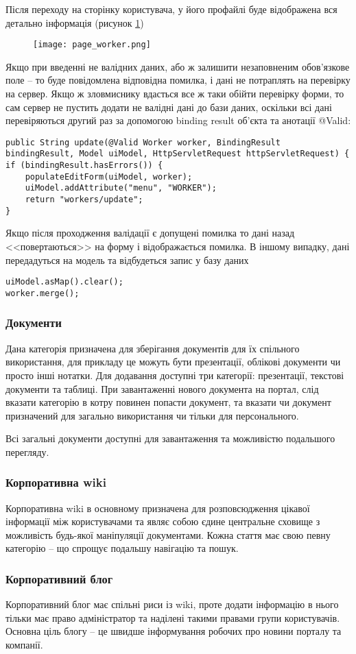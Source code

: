 \par Після переходу на сторінку користувача, у його профайлі буде відображена вся детально інформація (рисунок \ref{pic:page_worker})
  \begin{figure}[!ht]
  \centering
      \texttt{[image: page\_worker.png]}
      \label{pic:page_worker}
  \end{figure}
\par Якщо при введенні не валідних даних, або ж залишити незаповненим обов'язкове поле -- то буде повідомлена відповідна помилка, і дані не потраплять на перевірку на сервер. Якщо ж зловмиснику вдасться все ж таки обійти перевірку форми, то сам сервер не пустить додати не валідні дані до бази даних, оскільки всі дані перевіряються другий раз за допомогою binding result об'єкта та анотації @Valid:
\begin{lstlisting}
public String update(@Valid Worker worker, BindingResult bindingResult, Model uiModel, HttpServletRequest httpServletRequest) {
if (bindingResult.hasErrors()) {
    populateEditForm(uiModel, worker);
    uiModel.addAttribute("menu", "WORKER");
    return "workers/update";
}
\end{lstlisting}
\par Якщо після проходження валідації є допущені помилка то дані назад <<повертаються>> на форму і відображається помилка. В іншому випадку, дані передадуться на модель та відбудеться запис у базу даних
\begin{lstlisting}
uiModel.asMap().clear();
worker.merge();
\end{lstlisting}


\subsubsection{Документи}
Дана категорія призначена для зберігання документів для їх спільного використання, для прикладу це можуть бути презентації, облікові документи чи просто інші нотатки. Для додавання доступні три категорії: презентації, текстові документи та таблиці. При завантаженні нового документа на портал, слід вказати категорію в котру повинен попасти документ, та вказати чи документ призначений для загально використання чи тільки для персонального.
\par Всі загальні документи доступні для завантаження та можливістю подальшого перегляду.

\subsubsection{Корпоративна wiki}
\par Корпоративна wiki в основному призначена для розповсюдження цікавої інформації між користувачами та являє собою єдине центральне сховище з можливість будь-якої маніпуляції документами. Кожна стаття має свою певну категорію -- що спрощує подальшу навігацію та пошук.

\subsubsection{Корпоративний блог}
\par Корпоративний блог має спільні риси із wiki, проте додати інформацію в нього тільки має право адміністратор та наділені такими правами групи користувачів. Основна ціль блогу -- це швидше інформування робочих про новини порталу та компанії.
